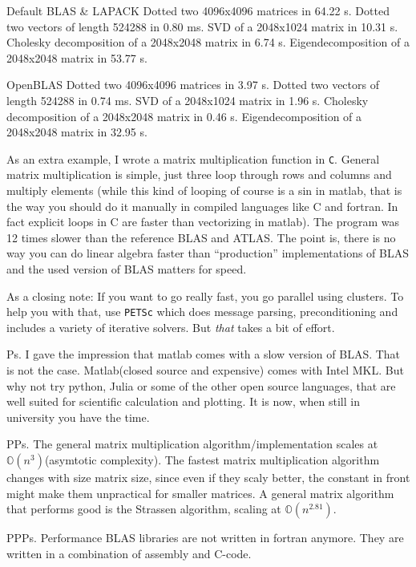 Default BLAS \& LAPACK
Dotted two 4096x4096 matrices in 64.22 s.
Dotted two vectors of length 524288 in 0.80 ms.
SVD of a 2048x1024 matrix in 10.31 s.
Cholesky decomposition of a 2048x2048 matrix in 6.74 s.
Eigendecomposition of a 2048x2048 matrix in 53.77 s.

OpenBLAS
Dotted two 4096x4096 matrices in 3.97 s.
Dotted two vectors of length 524288 in 0.74 ms.
SVD of a 2048x1024 matrix in 1.96 s.
Cholesky decomposition of a 2048x2048 matrix in 0.46 s.
Eigendecomposition of a 2048x2048 matrix in 32.95 s.

As an extra example, I wrote a matrix multiplication function in \texttt{C}.
General matrix multiplication is simple, just three loop through rows and
columns and multiply elements (while this kind of looping of course is a sin in
matlab, that is the way you should do it manually in compiled languages like C
and fortran. In fact explicit loops in C are faster than vectorizing in matlab).
The program was 12 times slower than the reference BLAS and ATLAS. The point is,
there is no way you can do linear algebra faster than ``production''
implementations of BLAS and the used version of BLAS matters for speed.

As a closing note: If you want to go really fast, you go parallel using
clusters. To help you with that, use \texttt{PETSc} which does message parsing,
preconditioning and includes a variety of iterative solvers. But \textit{that}
takes a bit of effort.

Ps.
I gave the impression that matlab comes with a slow version of BLAS. That is not
the case. Matlab(closed source and expensive) comes with Intel MKL. But why not
try python, Julia or some of the other open source languages, that are well
suited for scientific calculation and plotting. It is now, when still in
university you have the time.

PPs.
The general matrix multiplication algorithm/implementation scales at
$\mathbb{O}(n^3)$(asymtotic complexity). The fastest matrix multiplication
algorithm changes with size matrix size, since even if they scaly better, the
constant in front might make them unpractical for smaller matrices. A general
matrix algorithm that performs good is the Strassen algorithm, scaling at
$\mathbb{O}(n^{2.81})$.

PPPs.
Performance BLAS libraries are not written in fortran anymore. They are written
in a combination of assembly and C-code.


